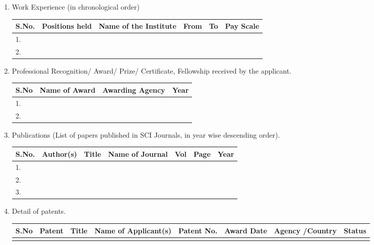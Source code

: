 \documentclass[12pt,a4paper]{article}
\begin{document}
\begin{enumerate}
	\item 	Work Experience (in chronological order)\\
			\begin{tabular}{|p{1cm}|p{3cm}|p{4cm}|p{1.5cm}|p{1.5cm}|p{2cm}|}
				\hline
				S.No. 	&Positions held		&Name of the Institute	&From 		&To 		&Pay Scale	\\
				\hline
				1.		&					&						&			&			&\\
				2.		&					&						&			&			&\\
				\hline
			\end{tabular}	
			
	\item 	Professional Recognition/ Award/ Prize/ Certificate, Fellowship received by the applicant. 
			\\
			\begin{tabular}{|p{1cm}|p{5cm}|p{6cm}|p{2cm}|}
				\hline
				S.No 	&Name of Award 		&Awarding Agency 	&Year	\\
				\hline	
				1.		&					&					& \\
				2.		&					&					& \\
				\hline
			\end{tabular}

	\item 	Publications (List of papers published in SCI Journals, in year wise descending order).
	
		\begin{tabular}{|p{1cm}|p{3cm}|p{4cm}|p{2.5cm}|p{.7cm}|p{.7cm}|p{.7cm}|}
			\hline
			S.No. 	&Author(s) 		&Title 		&Name of Journal 	&Vol 	&Page 		&Year	\\
			\hline
 			1.	 	&  				&			&					&			&			&			\\
			2.	 	&  				&			&					&			&			&			\\
			3.	 	&  				&			&					&			&			&			\\
			\hline								
		\end{tabular}				
		
		
	\item 	Detail of patents.\\
			\begin{tabular}{|p{.8cm}|p{1.1cm}| p{2.7cm}|p{2.5cm}|p{1.1cm}|p{1.1cm}|p{1.7cm}|p{1.1cm}|}
				\hline
				S.No 	&Patent 	&Title 	&Name of Applicant(s) 	&Patent No. 	&Award Date 	&Agency /Country 	&Status	\\
				\hline
				& & & & & & & \\
				\hline
			\end{tabular}					
	

\end{enumerate}
\end{document}
